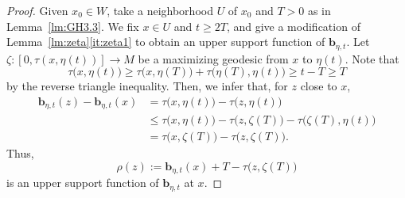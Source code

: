 \documentclass[a4paper,11pt]{article}
\numberwithin{equation}{section}
\theoremstyle{definition}
\theoremstyle{plain}
\newcommand{\lra}{\longrightarrow}
\newcommand{\bb}{\ensuremath{\mathbf{b}}}
\begin{document}
\begin{proof}
Given $x_0 \in W$, take a neighborhood $U$ of $x_0$ and $T>0$ as in Lemma~\ref{lm:GH3.3}.
We fix $x \in U$ and $t \ge 2T$, and give a modification of Lemma~\ref{lm:zeta}\eqref{it:zeta1} to obtain an upper support function of $\bb_{\eta,t}$.
Let $\zeta\colon [0,\tau(x,\eta(t))] \lra M$ be a maximizing geodesic from $x$ to $\eta(t)$.
Note that
\[ \tau\bigl( x,\eta(t) \bigr)
\ge \tau\bigl( x,\eta(T) \bigr) +\tau\bigl( \eta(T),\eta(t) \bigr)
\ge t-T \ge T \]
by the reverse triangle inequality.
Then, we infer that, for $z$ close to $x$,
\begin{align*}
\bb_{\eta,t}(z) -\bb_{\eta,t}(x)
&= \tau\bigl( x,\eta(t) \bigr) -\tau\bigl( z,\eta(t) \bigr) \\
&\le \tau\bigl( x,\eta(t) \bigr) -\tau\bigl( z,\zeta(T) \bigr) -\tau\bigl( \zeta(T),\eta(t) \bigr) \\
&= \tau\bigl( x,\zeta(T) \bigr) -\tau\bigl( z,\zeta(T) \bigr).
\end{align*}
Thus,
\[ \rho(z):=\bb_{\eta,t}(x) +T -\tau\bigl( z,\zeta(T) \bigr) \]
is an upper support function of $\bb_{\eta,t}$ at $x$.


\end{proof}
\end{document}
